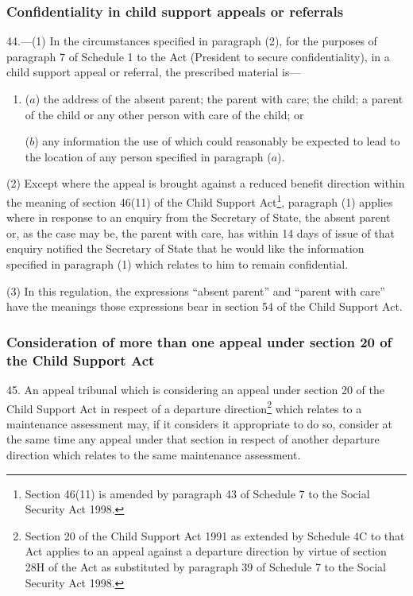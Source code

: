 \documentclass[12pt,a4paper]{article}
\begin{document}
\subsubsection[44. Confidentiality in child support appeals or referrals]{Confidentiality in child support appeals or referrals}

44.—(1) In the circumstances specified in paragraph (2), for the purposes of paragraph 7 of Schedule 1 to the Act (President to secure confidentiality), in a child support appeal or referral, the prescribed material is—
\begin{enumerate}\item[]
($a$) the address of the absent parent; the parent with care; the child; a parent of the child or any other person with care of the child; or

($b$) any information the use of which could reasonably be expected to lead to the location of any person specified in paragraph ($a$).
\end{enumerate}

(2) Except where the appeal is brought against a reduced benefit direction within the meaning of section 46(11) of the Child Support Act\footnote{\frenchspacing Section 46(11) is amended by paragraph 43 of Schedule 7 to the Social Security Act 1998.}, paragraph (1) applies where in response to an enquiry from the Secretary of State, the absent parent or, as the case may be, the parent with care, has within 14 days of issue of that enquiry notified the Secretary of State that he would like the information specified in paragraph (1) which relates to him to remain confidential.

(3) In this regulation, the expressions “absent parent” and “parent with care” have the meanings those expressions bear in section 54 of the Child Support Act.

\subsubsection[45. Consideration of more than one appeal under section 20 of the Child Support Act]{Consideration of more than one appeal under section 20 of the Child Support Act}

45.  An appeal tribunal which is considering an appeal under section 20 of the Child Support Act in respect of a departure direction\footnote{\frenchspacing Section 20 of the Child Support Act 1991 as extended by Schedule 4C to that Act applies to an appeal against a departure direction by virtue of section 28H of the Act as substituted by paragraph 39 of Schedule 7 to the Social Security Act 1998.} which relates to a maintenance assessment may, if it considers it appropriate to do so, consider at the same time any appeal under that section in respect of another departure direction which relates to the same maintenance assessment.
\end{document}

